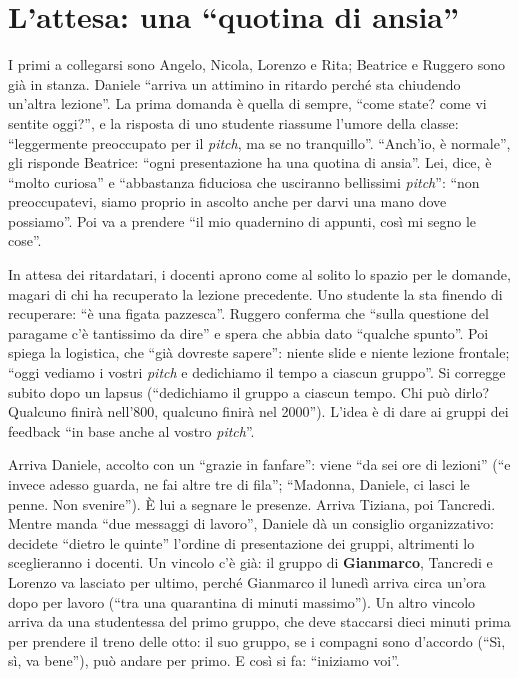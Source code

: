 \section{L'attesa: una ``quotina di ansia''}
\label{a11:sec:attesa}

I primi a collegarsi sono Angelo, Nicola, Lorenzo e Rita; Beatrice e Ruggero sono già
in stanza. Daniele ``arriva un attimino in ritardo perché sta chiudendo un'altra
lezione''. La prima domanda è quella di sempre, ``come state? come vi sentite oggi?'', e
la risposta di uno studente riassume l'umore della classe: ``leggermente preoccupato
per il \emph{pitch}, ma se no tranquillo''. ``Anch'io, è normale'', gli risponde
Beatrice: ``ogni presentazione ha una quotina di ansia''. Lei, dice, è ``molto curiosa''
e ``abbastanza fiduciosa che usciranno bellissimi \emph{pitch}'': ``non preoccupatevi,
siamo proprio in ascolto anche per darvi una mano dove possiamo''. Poi va a prendere
``il mio quadernino di appunti, così mi segno le cose''.

In attesa dei ritardatari, i docenti aprono come al solito lo spazio per le domande,
magari di chi ha recuperato la lezione precedente. Uno studente la sta finendo di
recuperare: ``è una figata pazzesca''. Ruggero conferma che ``sulla questione del
paragame c'è tantissimo da dire'' e spera che abbia dato ``qualche spunto''. Poi spiega
la logistica, che ``già dovreste sapere'': niente slide e niente lezione frontale; ``oggi
vediamo i vostri \emph{pitch} e dedichiamo il tempo a ciascun gruppo''. Si corregge
subito dopo un lapsus (``dedichiamo il gruppo a ciascun tempo. Chi può dirlo? Qualcuno
finirà nell'800, qualcuno finirà nel 2000''). L'idea è di dare ai gruppi dei feedback
``in base anche al vostro \emph{pitch}''.

Arriva Daniele, accolto con un ``grazie in fanfare'': viene ``da sei ore di lezioni''
(``e invece adesso guarda, ne fai altre tre di fila''; ``Madonna, Daniele, ci lasci le
penne. Non svenire''). È lui a segnare le presenze. Arriva Tiziana, poi Tancredi. Mentre
manda ``due messaggi di lavoro'', Daniele dà un consiglio organizzativo: decidete ``dietro
le quinte'' l'ordine di presentazione dei gruppi, altrimenti lo sceglieranno i docenti.
Un vincolo c'è già: il gruppo di \textbf{Gianmarco}, Tancredi e Lorenzo va lasciato per
ultimo, perché Gianmarco il lunedì arriva circa un'ora dopo per lavoro (``tra una
quarantina di minuti massimo''). Un altro vincolo arriva da una studentessa del primo
gruppo, che deve staccarsi dieci minuti prima per prendere il treno delle otto: il suo
gruppo, se i compagni sono d'accordo (``Sì, sì, va bene''), può andare per primo. E
così si fa: ``iniziamo voi''.


